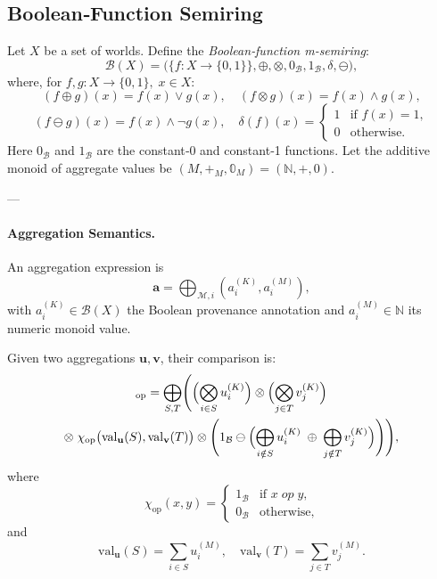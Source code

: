\documentclass{article}
\begin{document}
\subsection*{Boolean‐Function Semiring}

Let \(X\) be a set of worlds.  
Define the \emph{Boolean‐function m‐semiring}:
\[
  \mathcal{B}(X)
  = \bigl(\{f : X \to \{0,1\}\},\oplus,\otimes,0_{\mathcal{B}},1_{\mathcal{B}},\delta,\ominus\bigr),
\]
where, for \(f,g : X\to\{0,1\},\;x\in X\):
\[
  (f\oplus g)(x)=f(x)\vee g(x), \quad (f\otimes g)(x)=f(x)\wedge g(x),
\]
\[
  (f\ominus g)(x)=f(x)\wedge\neg g(x),\quad \delta(f)(x)=
  \begin{cases}
  1 & \text{if } f(x)=1,\\
  0 & \text{otherwise.}
  \end{cases}
\]
Here \(0_{\mathcal{B}}\) and \(1_{\mathcal{B}}\) are the constant‐0 and constant‐1 functions.  
Let the additive monoid of aggregate values be \((M,+_M,\mathbb{0}_M)=(\mathbb{N},+,0)\).

---

\paragraph{Aggregation Semantics.}  
An aggregation expression is
\[
\mathbf{a}=\bigoplus_{\mathcal{M},i}(a_i^{(K)},a_i^{(M)}),
\]
with \(a_i^{(K)}\in\mathcal{B}(X)\) the Boolean provenance annotation and \(a_i^{(M)}\in\mathbb{N}\) its numeric monoid value.  

Given two aggregations \(\mathbf{u},\mathbf{v}\), their comparison is:
\begin{multline}
[\mathbf{u}\oslash \mathbf{v}]_{\mathrm{op}}=
\bigoplus_{S,T}
\Biggl(
\Bigl(\bigotimes_{i\in S}u_i^{(K)}\Bigr)
\otimes
\Bigl(\bigotimes_{j\in T}v_j^{(K)}\Bigr) \\
\otimes\;\chi_{\mathrm{op}}\bigl(\mathrm{val}_\mathbf{u}(S),\mathrm{val}_\mathbf{v}(T)\bigr)
\otimes
\Biggl(1_{\mathcal{B}}\ominus\Bigl(\bigoplus_{i\notin S}u_i^{(K)}\;\oplus\;\bigoplus_{j\notin T}v_j^{(K)}\Bigr)\Biggr)
\Biggr),
\end{multline}
where
\[
\chi_{\mathrm{op}}(x,y)=
\begin{cases}
1_{\mathcal{B}} & \text{if } x\;\mathit{op}\; y, \\
0_{\mathcal{B}} & \text{otherwise,}
\end{cases}
\]
and
\[
\mathrm{val}_\mathbf{u}(S)=\sum_{i\in S}u_i^{(M)},\quad
\mathrm{val}_\mathbf{v}(T)=\sum_{j\in T}v_j^{(M)}.
\]
\end{document}
